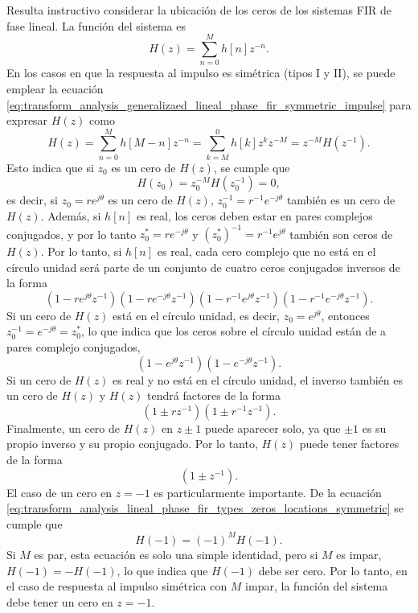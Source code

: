 \documentclass[a4paper]{report}
\begin{document}
Resulta instructivo considerar la ubicación de los ceros de los sistemas FIR de fase lineal. La función del sistema es
\[
 H(z)=\sum_{n=0}^M h[n]z^{-n}.
\]
En los casos en que la respuesta al impulso es simétrica (tipos I y II), se puede emplear la ecuación \ref{eq:transform_analysis_generalizaed_lineal_phase_fir_symmetric_impulse} para expresar \(H(z)\) como
\begin{equation}\label{eq:transform_analysis_lineal_phase_fir_types_zeros_locations_symmetric}
 H(z)=\sum_{n=0}^M h[M-n]z^{-n}=\sum_{k=M}^0 h[k]z^{k}z^{-M}=z^{-M}H(z^{-1}). 
\end{equation}
Esto indica que si \(z_0\) es un cero de \(H(z)\), se cumple que 
\[
 H(z_0)=z_0^{-M}H(z_0^{-1})=0,
\]
es decir, si \(z_0=re^{j\theta}\) es un cero de \(H(z)\), \(z_0^{-1}=r^{-1}e^{-j\theta}\) también es un cero de \(H(z)\). Además, si \(h[n]\) es real, los ceros deben estar en pares complejos conjugados, y por lo tanto \(z_0^*=re^{-j\theta}\) y \((z_0^*)^{-1}=r^{-1}e^{j\theta}\) también son ceros de \(H(z)\). Por lo tanto, si \(h[n]\) es real, cada cero complejo que no está en el círculo unidad será parte de un conjunto de cuatro ceros conjugados inversos de la forma 
\[
 (1-re^{j\theta}z^{-1})(1-re^{-j\theta}z^{-1})(1-r^{-1}e^{j\theta}z^{-1})(1-r^{-1}e^{-j\theta}z^{-1}).
\]
Si un cero de \(H(z)\) está en el círculo unidad, es decir, \(z_0=e^{j\theta}\), entonces \(z_0^{-1}=e^{-j\theta}=z_0^*\), lo que indica que los ceros sobre el círculo unidad están de a pares complejo conjugados,
\[
 (1-e^{j\theta}z^{-1})(1-e^{-j\theta}z^{-1}).
\]
Si un cero de \(H(z)\) es real y no está en el círculo unidad, el inverso también es un cero de \(H(z)\) y \(H(z)\) tendrá factores de la forma 
\[
 (1\pm rz^{-1})(1\pm r^{-1}z^{-1}).
\]
Finalmente, un cero de \(H(z)\) en \(z\pm1\) puede aparecer solo, ya que \(\pm1\) es su propio inverso y su propio conjugado. Por lo tanto, \(H(z)\) puede tener factores de la forma
\[
 (1\pm z^{-1}).
\]
El caso de un cero en \(z=-1\) es particularmente importante. De la ecuación \ref{eq:transform_analysis_lineal_phase_fir_types_zeros_locations_symmetric} se cumple que 
\[
 H(-1)=(-1)^MH(-1).
\]
Si \(M\) es par, esta ecuación es solo una simple identidad, pero si \(M\) es impar, \(H(-1)=-H(-1)\), lo que indica que \(H(-1)\) debe ser cero. Por lo tanto, en el caso de respuesta al impulso simétrica con \(M\) impar, la función del sistema debe tener un cero en \(z=-1\).
\end{document}
